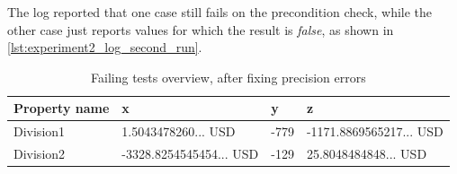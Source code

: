 The log reported that one case still fails on the precondition check, while the
other case just reports values for which the result is \textit{false}, as shown
in \autoref{lst:experiment2_log_second_run}.
\begin{table}[!ht]
\centering
\begin{tabular}{llll}
\hline
\textbf{Property name} & \textbf{x}                               & \textbf{y} & \textbf{z}                               \\ \hline
Division1              & 1.5043478260... USD     & -779       & -1171.8869565217... USD \\
Division2              & -3328.8254545454... USD & -129       & 25.8048484848... USD    \\ \hline
\end{tabular}
\caption{Failing tests overview, after fixing precision errors}
\label{tbl:experiment2_overview_second_run}
\end{table}
\FloatBarrier\noindent

